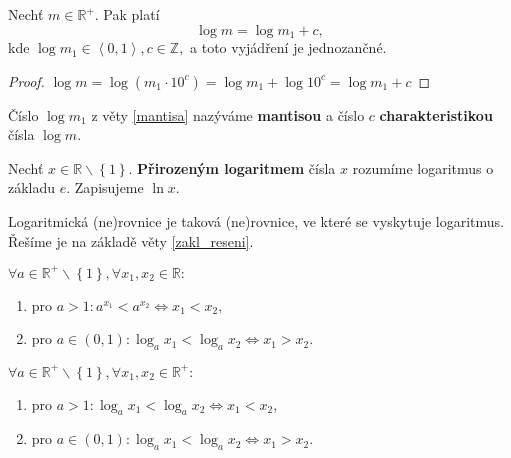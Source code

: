 \begin{veta}\label{mantisa}
    Nechť $m\in \mathbb R^+.$ Pak platí
    $$\log m = \log m_1 + c,$$
    kde $\log m_1 \in \left < 0,1 \right >, c \in \mathbb Z,$ a toto vyjádření
    je jednozančné.
\end{veta}

\begin{proof}
    $\log m = \log \left ( m_1\cdot 10^c \right ) = \log m_1 + \log 10^c
    = \log m_1 + c$
\end{proof}

\begin{definition}
    Číslo $\log m_1$ z věty \ref{mantisa} nazýváme \textbf{mantisou} a číslo
    $c$ \textbf{charakteristikou} čísla $\log m.$
\end{definition}

\begin{definition}
    Nechť $x \in \mathbb R\smallsetminus\left \{ 1 \right \}. $ \textbf{Přirozeným logaritmem} čísla $x$
    rozumíme logaritmus o základu $e$. Zapisujeme $\ln x.$
\end{definition}

\begin{pozn}
    Logaritmická (ne)rovnice je taková (ne)rovnice, ve které se vyskytuje logaritmus.
    Řešíme je na základě věty \ref{zakl_reseni}.
\end{pozn}

\begin{veta}
    $\forall a \in \mathbb R^+ \smallsetminus \left \{ 1 \right \} , \forall x_1, x_2
    \in \mathbb R:$
    \begin{enumerate}[$i.$]
        \item pro $a>1:a^{x_1}<a^{x_2}\iff x_1 < x_2,$
       	\item pro $a \in (0,1): \log_a x_1 < \log_a x_2 \iff x_1 > x_2.$
    \end{enumerate}
\end{veta}

\begin{veta}
    $\forall a \in \mathbb R^+ \smallsetminus \left \{ 1 \right \} , \forall x_1, x_2
    \in \mathbb R^+:$
    \begin{enumerate}[$i.$]
        \item pro $a>1:\log_a x_1 < \log_a x_2 \iff x_1 < x_2$,
       	\item pro $a\in (0,1): \log_a x_1 < \log_a x_2 \iff x_1 > x_2.$
    \end{enumerate}
\end{veta}
